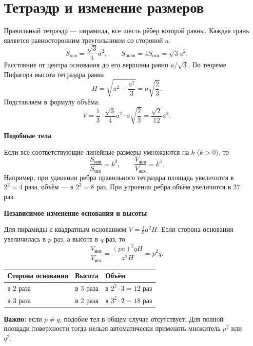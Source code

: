\documentclass[a4paper,12pt]{article}
\newcommand{\sub}[1]{\par\medskip\textcolor{darkaccent}{\textbf{#1}}\par\smallskip}
\newcommand{\Sos}{S_{\text{осн}}}
\newcommand{\Sp}{S_{\text{полн}}}
\begin{document}
\section{Тетраэдр и изменение размеров}
Правильный тетраэдр --- пирамида, все шесть рёбер которой равны. Каждая грань является равносторонним треугольником со стороной $a$.
\[
\Sos=\frac{\sqrt3}{4}a^2,\qquad \Sp=4\Sos=\sqrt3 a^2.
\]
Расстояние от центра основания до его вершины равно $a/\sqrt3$. По теореме Пифагора высота тетраэдра равна
\[
H=\sqrt{a^2-\frac{a^2}{3}}=a\sqrt{\frac23}.
\]
Подставляем в формулу объёма:
\[
V=\frac13\cdot\frac{\sqrt3}{4}a^2\cdot a\sqrt{\frac23}
=\frac{\sqrt2}{12}a^3.
\]
\sub{Подобные тела}
Если все соответствующие линейные размеры умножаются на $k$ ($k>0$), то
\[
\frac{S_{\text{нов}}}{S_{\text{исх}}}=k^2,\qquad
\frac{V_{\text{нов}}}{V_{\text{исх}}}=k^3.
\]
Например, при удвоении ребра правильного тетраэдра площадь увеличится в $2^2=4$ раза, объём --- в $2^3=8$ раз. При утроении ребра объём увеличится в $27$ раз.
\sub{Независимое изменение основания и высоты}
Для пирамиды с квадратным основанием $V=\frac13 a^2H$. Если сторона основания увеличилась в $p$ раз, а высота в $q$ раз, то
\[
\frac{V_{\text{нов}}}{V_{\text{исх}}}=\frac{(pa)^2qH}{a^2H}=p^2q.
\]
\begin{center}
\begin{tabular}{@{}lll@{}}
\toprule
Сторона основания & Высота & Объём \\\midrule
в $2$ раза & в $3$ раза & в $2^2\cdot3=12$ раз\\
в $3$ раза & в $2$ раза & в $3^2\cdot2=18$ раз\\\bottomrule
\end{tabular}
\end{center}
\textbf{Важно:} если $p\ne q$, подобие тел в общем случае отсутствует. Для полной площади поверхности тогда нельзя автоматически применять множитель $p^2$ или $q^2$.
\clearpage
\end{document}
